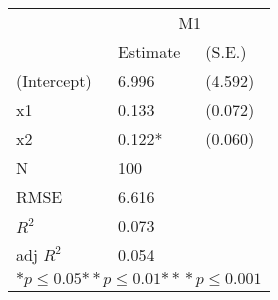 \begin{tabular}{*{3}{l}}
\hline
                  & \multicolumn{2}{c}{M1}   \tabularnewline
                   &Estimate  &(S.E.)  \tabularnewline
 \hline
 \hline
   (Intercept)     &6.996   &   (4.592) \tabularnewline
   x1              &0.133   &   (0.072) \tabularnewline
   x2              &0.122*   &   (0.060) \tabularnewline
 \hline
 N                 &100       &        \tabularnewline
 RMSE             &6.616         & \tabularnewline
 $R^2$             &0.073         & \tabularnewline
 adj $R^2$         &0.054         & \tabularnewline
 \hline
\hline
 
 \multicolumn{3}{c}{${*  p}\le 0.05$${*\!\!*  p}\le 0.01$${*\!\!*\!\!*  p}\le 0.001$}\tabularnewline
 \end{tabular}